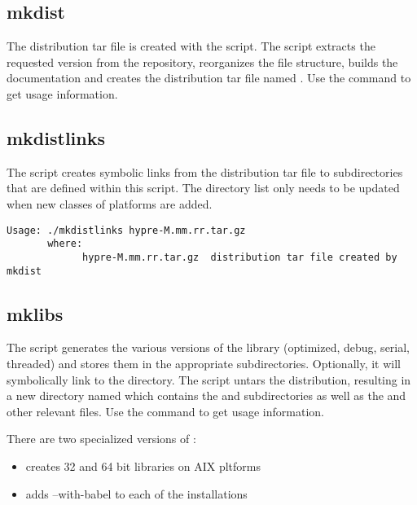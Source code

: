 \subsection{mkdist}
\label{mkdist}

The distribution tar file is created with the  script.  The
 script extracts the requested version from the repository,
reorganizes the file structure, builds the documentation and creates the
distribution tar file named .  Use the command
 to get usage information.

\subsection{mkdistlinks}
\label{mkdistlinks}

The  script creates symbolic links from the \hypre{}
distribution tar file to subdirectories that are defined within this script.
The directory list only needs to be updated when new classes of platforms are
added.

\begin{verbatim}
Usage: ./mkdistlinks hypre-M.mm.rr.tar.gz
       where:
             hypre-M.mm.rr.tar.gz  distribution tar file created by mkdist
\end{verbatim}

\subsection{mklibs}
\label{mklibs}

The  script generates the various versions of the library
(optimized, debug, serial, threaded) and stores them in the appropriate
subdirectories. Optionally, it will symbolically link to the
 directory.  The  script untars the
distribution, resulting in a new directory named  which
contains the  and  subdirectories as well as the
 and other relevant files.  Use the command 
to get usage information.

There are two specialized versions of :
\begin{itemize}
\item {}   creates 32 and 64 bit libraries on AIX pltforms
\item {} adds --with-babel to each of the installations
\end{itemize}
   
